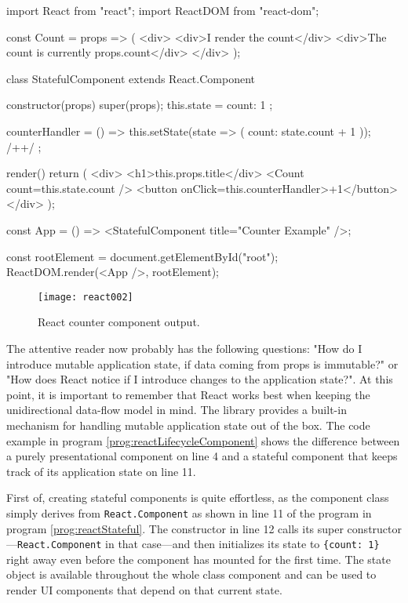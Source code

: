 \begin{program}
\caption{Simple example of a React component and its usage.} 
\label{prog:reactStateful}
\begin{JsCode}
import React from "react";
import ReactDOM from "react-dom";

const Count = props => (
  <div>
    <div>I render the count</div>
    <div>The count is currently {props.count}</div>
  </div>
);

class StatefulComponent extends React.Component {
  constructor(props) {
    super(props);
    this.state = {
      count: 1
    };
  }

  counterHandler = () => {
    this.setState(state => ({ count: state.count + 1 })); /+\label{line:setState}+/
  };

  render() {
    return (
      <div>
        <h1>{this.props.title}</div>
        <Count count={this.state.count} />
        <button onClick={this.counterHandler}>+1</button>
      </div>
    );
  }
}

const App = () => <StatefulComponent title={"Counter Example"} />;

const rootElement = document.getElementById("root");
ReactDOM.render(<App />, rootElement);
\end{JsCode}
\end{program}

\begin{figure}
  \centering
  \texttt{[image: react002]}
  \caption{React counter component output.}
  \label{fig:reactCounterComponent}
\end{figure}

The attentive reader now probably has the following questions: "How do I introduce mutable application state, if data coming from props is immutable?" or "How does React notice if I introduce changes to the application state?". At this point, it is important to remember that React works best when keeping the unidirectional data-flow model in mind. The library provides a built-in mechanism for handling mutable application state out of the box. The code example in program \ref{prog:reactLifecycleComponent} shows the difference between a purely presentational component on line 4 and a stateful component that keeps track of its application state on line 11.

First of, creating stateful components is quite effortless, as the component class simply derives from \texttt{React.Component} as shown in line 11 of the program in program \ref{prog:reactStateful}. The constructor in line 12 calls its super constructor---\texttt{React.Component} in that case---and then initializes its state to \texttt{\{count: 1\}} right away even before the component has mounted for the first time. The state object is available throughout the whole class component and can be used to render UI components that depend on that current state.

